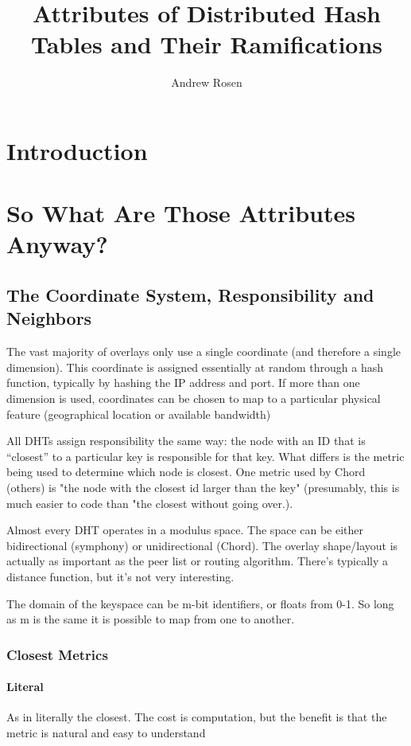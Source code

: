 \documentclass[10pt,letterpaper]{report}
\author{Andrew Rosen}
\title{Attributes of Distributed Hash Tables and Their Ramifications}
\begin{document}
\maketitle


\chapter{Introduction}


\chapter{So What Are Those Attributes Anyway?}

\section{The Coordinate System, Responsibility and Neighbors}

The vast majority of overlays only use a single coordinate (and therefore a single dimension).  This coordinate is assigned essentially at random through a hash function, typically by hashing the IP address and port.  If more than one dimension is used, coordinates can be chosen to map to a particular physical feature (geographical location  or available bandwidth)

All DHTs assign responsibility the same way:  the node with an ID that is ``closest'' to a particular key is responsible for that key.  What differs is the metric being used to determine which node is closest.  One metric used by Chord (others) is "the node with the closest id larger than the key" (presumably, this is much easier to code than "the closest without going over.).

Almost every DHT operates in a modulus space.  The space can be either bidirectional (symphony) or unidirectional (Chord).
The overlay shape/layout is actually as important as the peer list or  routing algorithm.
There's typically a distance function, but it's not very interesting.


The domain of the keyspace can be m-bit identifiers, or floats from 0-1.  So long as m is the same it is possible to map from one to another.
\subsection{Closest Metrics}


\subsubsection{Literal}
As in literally the closest.  The cost is computation, but the benefit is that the metric is natural and easy to understand
\end{document}
